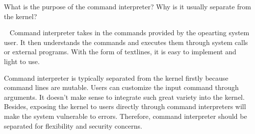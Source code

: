  
\begin{exercise}[]{What is the purpose of the command interpreter? Why is it usually
  separate from the kernel?}
  \begin{solution}
    \par{~}
    Command interpreter takes in the commands provided by the opearting system user. It then understands the commands and executes them through system calls or external programs. With the form of textlines, it is easy to implement and light to use.

    Command interpreter is typically separated from the kernel firstly because command lines are mutable. Users can customize the input command through arguments. It doesn't make sense to integrate such great variety into the kernel. Besides, exposing the kernel to users directly through command interpreters will make the system vulnerable to errors. Therefore, command interpreter should be separated for flexibility and security concerns.
  \end{solution}
  \label{ex4}
\end{exercise}
